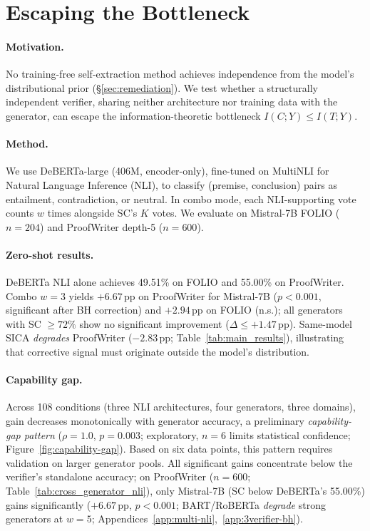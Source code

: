 \section{Escaping the Bottleneck}
\label{sec:solutions}
\label{sec:cross-arch}

\paragraph{Motivation.}
 No training-free self-extraction method achieves independence from the model's distributional prior (\S\ref{sec:remediation}). We test whether a structurally independent verifier, sharing neither architecture nor training data with the generator, can escape the information-theoretic bottleneck $I(C;Y) \leq I(T;Y)$.

\paragraph{Method.}
 We use DeBERTa-large \citep{he2021deberta} (406M, encoder-only), fine-tuned on MultiNLI \citep{williams2018mnli} for Natural Language Inference (NLI), to classify (premise, conclusion) pairs as entailment, contradiction, or neutral. In combo mode, each NLI-supporting vote counts $w$ times alongside SC's $K$ votes. We evaluate on Mistral-7B FOLIO ($n = 204$) and ProofWriter depth-5 ($n = 600$).

\paragraph{Zero-shot results.}
 DeBERTa NLI alone achieves 49.51\% on FOLIO and 55.00\% on ProofWriter. Combo $w{=}3$ yields $+6.67$\,pp on ProofWriter for Mistral-7B ($p < 0.001$, significant after BH correction) and $+2.94$\,pp on FOLIO (n.s.); all generators with SC $\geq 72\%$ show no significant improvement ($\Delta \leq +1.47$\,pp). Same-model SICA \emph{degrades} ProofWriter ($-2.83$\,pp; Table~\ref{tab:main_results}), illustrating that corrective signal must originate outside the model's distribution.

\paragraph{Capability gap.}
 Across 108 conditions (three NLI architectures, four generators, three domains), gain decreases monotonically with generator accuracy, a preliminary \emph{capability-gap pattern} ($\rho = 1.0$, $p = 0.003$; exploratory, $n{=}6$ limits statistical confidence; Figure~\ref{fig:capability-gap}). Based on six data points, this pattern requires validation on larger generator pools. All significant gains concentrate below the verifier's standalone accuracy; on ProofWriter ($n{=}600$; Table~\ref{tab:cross_generator_nli}), only Mistral-7B (SC below DeBERTa's 55.00\%) gains significantly ($+6.67$\,pp, $p < 0.001$; BART/RoBERTa \emph{degrade} strong generators at $w{=}5$; Appendices~\ref{app:multi-nli},~\ref{app:3verifier-bh}).

